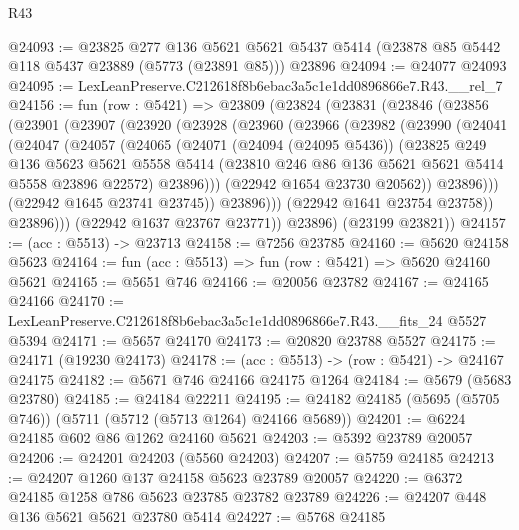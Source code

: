 \begin{lexlean}{R43}
\begin{coremodule}
@24093 := @23825
    @277
    @136
    @5621
    @5621
    @5437
    @5414
    (@23878 @85 @5442 @118 @5437 @23889 (@5773 (@23891 @85)))
    @23896
@24094 := @24077 @24093
@24095 := LexLeanPreserve.C212618f8b6ebac3a5c1e1dd0896866e7.R43.__rel_7
@24156 := fun (row : @5421) =>
  @23809
    (@23824
      (@23831
        (@23846
          (@23856
            (@23901
              (@23907
                (@23920
                  (@23928
                    (@23960
                      (@23966
                        (@23982
                          (@23990
                            (@24041
                              (@24047
                                (@24057
                                  (@24065
                                    (@24071
                                      (@24094 (@24095 @5436))
                                      (@23825
                                        @249
                                        @136
                                        @5623
                                        @5621
                                        @5558
                                        @5414
                                        (@23810 @246 @86 @136 @5621 @5621 @5414 @5558 @23896 @22572)
                                        @23896)))
                                  (@22942 @1654 @23730 @20562))
                                @23896)))
                          (@22942 @1645 @23741 @23745))
                        @23896)))
                  (@22942 @1641 @23754 @23758))
                @23896)))
          (@22942 @1637 @23767 @23771))
        @23896)
      (@23199 @23821))
@24157 := (acc : @5513) -> @23713
@24158 := @7256 @23785
@24160 := @5620 @24158 @5623
@24164 := fun (acc : @5513) => fun (row : @5421) => @5620 @24160 @5621
@24165 := @5651 @746
@24166 := @20056 @23782
@24167 := @24165 @24166
@24170 := LexLeanPreserve.C212618f8b6ebac3a5c1e1dd0896866e7.R43.__fits_24 @5527 @5394
@24171 := @5657 @24170
@24173 := @20820 @23788 @5527
@24175 := @24171 (@19230 @24173)
@24178 := (acc : @5513) -> (row : @5421) -> @24167 @24175
@24182 := @5671 @746 @24166 @24175 @1264
@24184 := @5679 (@5683 @23780)
@24185 := @24184 @22211
@24195 := @24182 @24185 (@5695 (@5705 @746)) (@5711 (@5712 (@5713 @1264) @24166 @5689))
@24201 := @6224 @24185 @602 @86 @1262 @24160 @5621
@24203 := @5392 @23789 @20057
@24206 := @24201 @24203 (@5560 @24203)
@24207 := @5759 @24185
@24213 := @24207 @1260 @137 @24158 @5623 @23789 @20057
@24220 := @6372 @24185 @1258 @786 @5623 @23785 @23782 @23789
@24226 := @24207 @448 @136 @5621 @5621 @23780 @5414
@24227 := @5768 @24185

\end{coremodule}
\end{lexlean}
